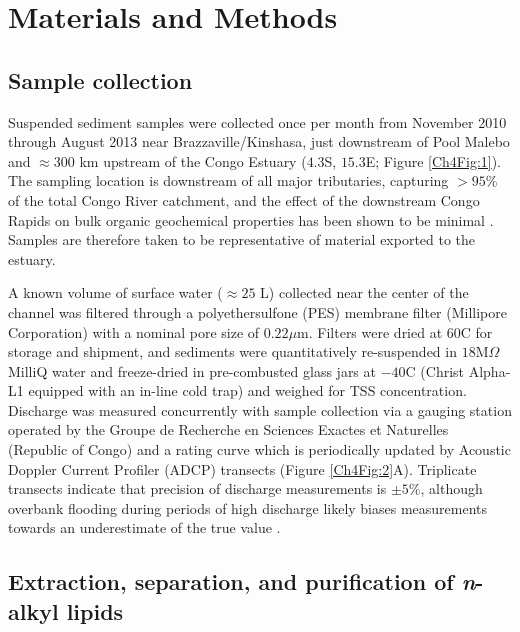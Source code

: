 \section{Materials and Methods}

\subsection{Sample collection}

Suspended sediment samples were collected once per month from November 2010 through August 2013 near Brazzaville/Kinshasa, just downstream of Pool Malebo and $\approx 300$ km upstream of the Congo Estuary ($4.3$\textdegree S, $15.3$\textdegree E; Figure \ref{Ch4Fig:1}). The sampling location is downstream of all major tributaries, capturing $>95$\% of the total Congo River catchment, and the effect of the downstream Congo Rapids on bulk organic geochemical properties has been shown to be minimal \citep{Spencer:2012en}. Samples are therefore taken to be representative of material exported to the estuary.

A known volume of surface water ($\approx 25$ L) collected near the center of the channel was filtered through a polyethersulfone (PES) membrane filter (Millipore Corporation) with a nominal pore size of $0.22\mu$m. Filters were dried at $60$\textdegree C for storage and shipment, and sediments were quantitatively re-suspended in $18$M$\Omega$ MilliQ water and freeze-dried in pre-combusted glass jars at $-40$\textdegree C (Christ Alpha-L1 equipped with an in-line cold trap) and weighed for TSS concentration. Discharge was measured concurrently with sample collection via a gauging station operated by the Groupe de Recherche en Sciences Exactes et Naturelles (Republic of Congo) and a rating curve which is periodically updated by Acoustic Doppler Current Profiler (ADCP) transects (Figure \ref{Ch4Fig:2}A). Triplicate transects indicate that precision of discharge measurements is $\pm 5$\%, although overbank flooding during periods of high discharge likely biases measurements towards an underestimate of the true value \citep{Spencer:2014vp}.

\subsection{Extraction, separation, and purification of \textit{n}-alkyl lipids}

